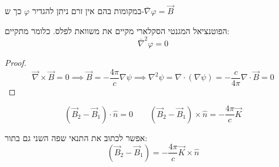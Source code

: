 \documentclass{tstextbook}
\begin{document}
\begin{definition}
במקומות בהם אין זרם ניתן להגדיר \(\varphi\) כך ש-\(\bar{\nabla}\varphi=\vec{B}\)

\end{definition}
\begin{proposition}
הפוטנציאל המגנטי הסקלארי מקיים את משוואת לפלס. כלומר מתקיים:
$$\bar{\nabla}^2 \varphi = 0$$

\end{proposition}
\begin{proof}
$${\vec{\nabla}}\times{\vec{B}}=0\implies {\vec{B}}=-{\frac{4\pi}{c}}\nabla\psi\implies \nabla^{2}\psi=\nabla\cdot(\nabla\psi)=-{\frac{c}{4\pi}}\nabla\cdot{\vec{B}}=0$$

\end{proof}
\begin{proposition}
$$\left( \vec{B}_{2}-\vec{B}_{1} \right)\cdot\hat{n}=0 \qquad (\vec{B}_{2}-\vec{B}_{1})\times\hat{n}=-\frac{4\pi}{c}\vec{K}$$

\end{proposition}
\begin{remark}
אפשר לכתוב את התנאי שפה השני גם בתור:
$$\left( \vec{B}_{2}-\vec{B}_{1} \right)=-\frac{4\pi}{c}\vec{K}\times \hat{n}$$

\end{remark}
\end{document}
